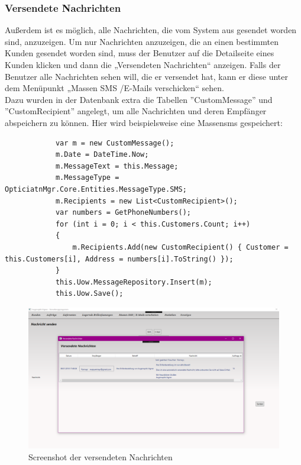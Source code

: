\subsubsection{Versendete Nachrichten}
Außerdem ist es möglich, alle Nachrichten, die vom System aus gesendet worden sind, anzuzeigen. Um nur Nachrichten anzuzeigen, die an einen bestimmten Kunden gesendet worden sind, muss der Benutzer auf die Detailseite eines Kunden klicken und dann die „Versendeten Nachrichten“ anzeigen. Falls der Benutzer alle Nachrichten sehen will, die er versendet hat, kann er diese unter dem Menüpunkt „Massen SMS /E-Mails verschicken“ sehen.\\
Dazu wurden in der Datenbank extra die Tabellen ''CustomMessage'' und ''CustomRecipient'' angelegt, um alle Nachrichten und deren Empfänger abspeichern zu können. Hier wird beispielsweise eine Massensms gespeichert:
\begin{lstlisting}
            var m = new CustomMessage();
            m.Date = DateTime.Now;
            m.MessageText = this.Message;
            m.MessageType = OpticiatnMgr.Core.Entities.MessageType.SMS;
            m.Recipients = new List<CustomRecipient>();
            var numbers = GetPhoneNumbers();
            for (int i = 0; i < this.Customers.Count; i++)
            {
                m.Recipients.Add(new CustomRecipient() { Customer = this.Customers[i], Address = numbers[i].ToString() });
            }
            this.Uow.MessageRepository.Insert(m);
            this.Uow.Save();
\end{lstlisting}
\begin{figure}[H]
\begin{center}
	\includegraphics[scale=.25]{images/VersendeteNachrichten.png}
\end{center}
	\caption{Screenshot der versendeten Nachrichten}
	\label{fig:sample}
\end{figure}



